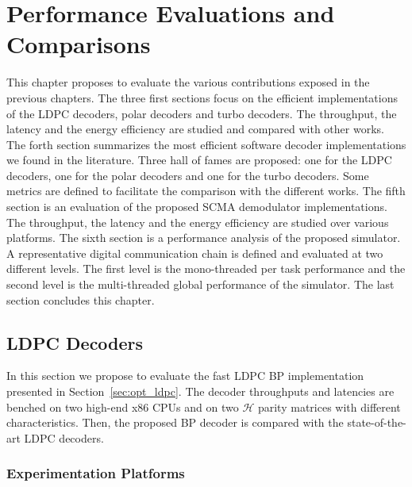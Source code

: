
\renewcommand{\curChapter}{main/chapter4}

\chapter{Performance Evaluations and Comparisons}
\label{chap:eval}

This chapter proposes to evaluate the various contributions exposed in the
previous chapters. The three first sections focus on the efficient
implementations of the LDPC decoders, polar decoders and turbo decoders. The
throughput, the latency and the energy efficiency are studied and compared with
other works. The forth section summarizes the most efficient software decoder
implementations we found in the literature. Three hall of fames are proposed:
one for the LDPC decoders, one for the polar decoders and one for the turbo
decoders. Some metrics are defined to facilitate the comparison with the
different works. The fifth section is an evaluation of the proposed SCMA
demodulator implementations. The throughput, the latency and the energy
efficiency are studied over various platforms. The sixth section is a
performance analysis of the proposed \AFFECT simulator. A representative digital
communication chain is defined and evaluated at two different levels. The first
level is the mono-threaded per task performance and the second level is the
multi-threaded global performance of the simulator. The last section concludes
this chapter.

\vspace*{\fill}
\minitoccustom
\vspace*{\fill}

\newpage
\section{LDPC Decoders}
\label{sec:eval_ldpc}

In this section we propose to evaluate the fast LDPC BP implementation presented
in Section~\ref{sec:opt_ldpc}. The decoder throughputs and latencies are benched
on two high-end x86 CPUs and on two $\mathcal{H}$ parity matrices with different
characteristics. Then, the proposed BP decoder is compared with the
state-of-the-art LDPC decoders.

\subsection{Experimentation Platforms}

